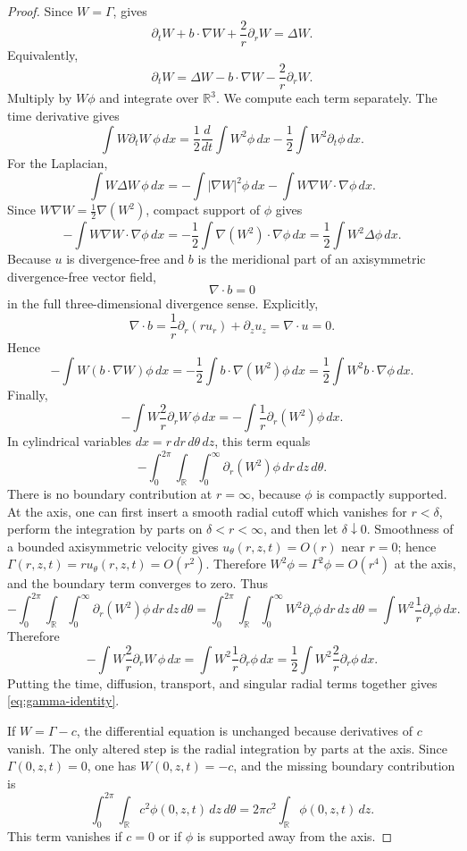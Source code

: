\documentclass[11pt]{amsart}
\theoremstyle{plain}
\theoremstyle{definition}
\theoremstyle{remark}
\numberwithin{equation}{section}
\begin{document}
\begin{proof}
Since \(W=\Gamma\),  gives
\[
   \partial_tW+b\cdot\nabla W+\frac2r\partial_rW=\Delta W .
\]
Equivalently,
\[
   \partial_tW
   =
   \Delta W-b\cdot\nabla W-\frac2r\partial_rW .
\]
Multiply by \(W\phi\) and integrate over \(\mathbb R^3\).  We compute each
term separately.  The time derivative gives
\[
   \int W\partial_tW\,\phi\,dx
   =
   \frac12\frac{d}{dt}\int W^2\phi\,dx
   -
   \frac12\int W^2\partial_t\phi\,dx .
\]
For the Laplacian,
\[
   \int W\Delta W\,\phi\,dx
   =
   -\int|\nabla W|^2\phi\,dx
   -\int W\nabla W\cdot\nabla\phi\,dx .
\]
Since \(W\nabla W=\frac12\nabla(W^2)\), compact support of \(\phi\) gives
\[
   -\int W\nabla W\cdot\nabla\phi\,dx
   =
   -\frac12\int\nabla(W^2)\cdot\nabla\phi\,dx
   =
   \frac12\int W^2\Delta\phi\,dx .
\]
Because \(u\) is divergence-free and \(b\) is the meridional part of an
axisymmetric divergence-free vector field,
\[
   \nabla\cdot b=0
\]
in the full three-dimensional divergence sense.  Explicitly,
\[
   \nabla\cdot b
   =
   \frac1r\partial_r(ru_r)+\partial_z u_z
   =
   \nabla\cdot u
   =
   0 .
\]
Hence
\[
   -\int W(b\cdot\nabla W)\phi\,dx
   =
   -\frac12\int b\cdot\nabla(W^2)\phi\,dx
   =
   \frac12\int W^2 b\cdot\nabla\phi\,dx .
\]
Finally,
\[
   -\int W\frac2r\partial_rW\,\phi\,dx
   =
   -\int \frac1r\partial_r(W^2)\phi\,dx .
\]
In cylindrical variables \(dx=r\,dr\,d\theta\,dz\), this term equals
\[
   -\int_0^{2\pi}\int_{\mathbb R}\int_0^\infty
      \partial_r(W^2)\phi\,dr\,dz\,d\theta .
\]
There is no boundary contribution at \(r=\infty\), because \(\phi\) is
compactly supported.  At the axis, one can first insert a smooth radial cutoff
which vanishes for \(r<\delta\), perform the integration by parts on
\(\delta<r<\infty\), and then let \(\delta\downarrow0\).  Smoothness of a
bounded axisymmetric velocity gives \(u_\theta(r,z,t)=O(r)\) near \(r=0\);
hence \(\Gamma(r,z,t)=ru_\theta(r,z,t)=O(r^2)\).  Therefore
\(W^2\phi=\Gamma^2\phi=O(r^4)\) at the axis, and the boundary term converges
to zero.  Thus
\[
   -\int_0^{2\pi}\int_{\mathbb R}\int_0^\infty
      \partial_r(W^2)\phi\,dr\,dz\,d\theta
   =
   \int_0^{2\pi}\int_{\mathbb R}\int_0^\infty
      W^2\partial_r\phi\,dr\,dz\,d\theta
   =
   \int W^2\frac1r\partial_r\phi\,dx .
\]
Therefore
\[
   -\int W\frac2r\partial_rW\,\phi\,dx
   =
   \int W^2\frac1r\partial_r\phi\,dx
   =
   \frac12\int W^2\frac2r\partial_r\phi\,dx .
\]
Putting the time, diffusion, transport, and singular radial terms together
gives \eqref{eq:gamma-identity}.

If \(W=\Gamma-c\), the differential equation is unchanged because derivatives
of \(c\) vanish.  The only altered step is the radial integration by parts at
the axis.  Since \(\Gamma(0,z,t)=0\), one has \(W(0,z,t)=-c\), and the missing
boundary contribution is
\[
   \int_0^{2\pi}\int_{\mathbb R}c^2\phi(0,z,t)\,dz\,d\theta
   =
   2\pi c^2\int_{\mathbb R}\phi(0,z,t)\,dz .
\]
This term vanishes if \(c=0\) or if \(\phi\) is supported away from the axis.
\end{proof}
\end{document}
